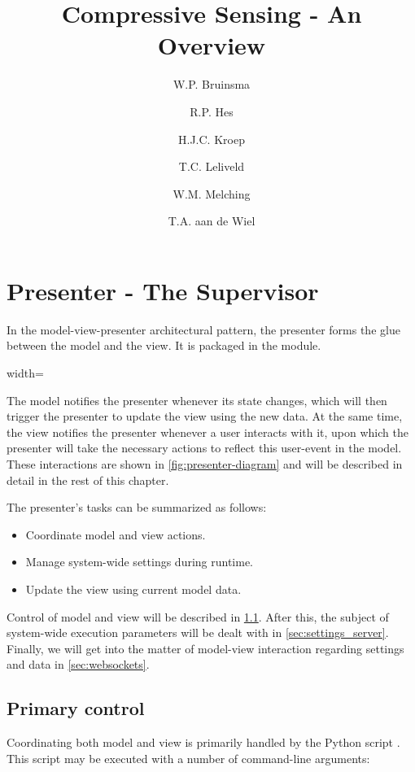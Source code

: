 \documentclass[a4paper, openany, oneside]{memoir}
\title{Compressive Sensing - An Overview}
\author{W.P. Bruinsma \and R.P. Hes \and H.J.C. Kroep \and T.C. Leliveld \and W.M. Melching \and T.A. aan de Wiel}
\begin{document}
\chapter{Presenter - The Supervisor}
\label{cha:presenter}
In the model-view-presenter architectural pattern, the presenter forms the glue between the model and the view. It is packaged in the  module.
\begin{figure*}[h]
    \centering
    \begin{adjustbox}{width=\textwidth}
    
    \end{adjustbox}
    \caption{The presenter and the central role it fulfils in the system}
    \label{fig:presenter-diagram}
\end{figure*}

The model notifies the presenter whenever its state changes, which will then trigger the presenter to update the view using the new data. At the same time, the view notifies the presenter whenever a user interacts with it, upon which the presenter will take the necessary actions to reflect this user-event in the model. These interactions are shown in \cref{fig:presenter-diagram} and will be described in detail in the rest of this chapter.

The presenter's tasks can be summarized as follows:
\begin{itemize}
	\item Coordinate model and view actions.
	\item Manage system-wide settings during runtime.
	\item Update the view using current model data.
\end{itemize}

Control of model and view will be described in \cref{sec:control}. After this, the subject of system-wide execution parameters will be dealt with in \cref{sec:settings_server}. Finally, we will get into the matter of model-view interaction regarding settings and data in \cref{sec:websockets}.

\section{Primary control}
\label{sec:control}
Coordinating both model and view is primarily handled by the Python script . This script may be executed with a number of command-line arguments:
\end{document}
